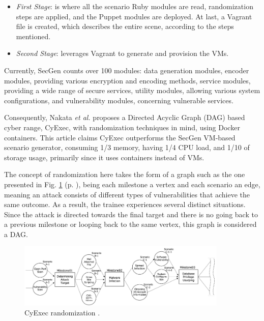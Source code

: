\begin{itemize}
    \item \textit{First Stage}: is where all the scenario Ruby modules are read, randomization steps are applied, and the Puppet modules are deployed. At last, a Vagrant file is created, which describes the entire scene, according to the steps mentioned.
    \item \textit{Second Stage}: leverages Vagrant to generate and provision the VMs. 
\end{itemize}

Currently, SecGen counts over 100 modules: data generation modules, encoder modules, providing various encryption and encoding methods, service modules, providing a wide range of secure services, utility modules, allowing various system configurations, and vulnerability modules, concerning vulnerable services. 


Consequently, Nakata \textit{et al.} \cite{cyexec_ref} proposes a Directed Acyclic Graph (DAG) based cyber range, CyExec, with randomization techniques in mind, using Docker containers. This article claims CyExec outperforms the SecGen VM-based scenario \cite{secgen_ref} generator, consuming 1/3 memory, having 1/4 CPU load, and 1/10 of storage usage, primarily since it uses containers instead of VMs.

The concept of randomization here takes the form of a graph such as the one presented in Fig. \ref{fig:cyexec_randomization} (p. \pageref{fig:cyexec_randomization}), being each milestone a vertex and each scenario an edge, meaning an attack consists of different types of vulnerabilities that achieve the same outcome. As a result, the trainee experiences several distinct situations. Since the attack is directed towards the final target and there is no going back to a previous milestone or looping back to the same vertex, this graph is considered a DAG.

\begin{figure}[H]
    \includegraphics[width=10cm]{figures/cyexec_randomization.png}
    \caption{CyExec randomization \cite{cyexec_ref}.}
    \label{fig:cyexec_randomization}
\end{figure}

